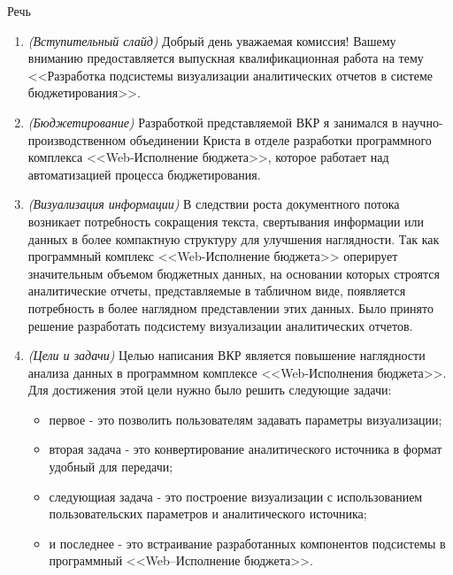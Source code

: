 \documentclass[a4paper]{report}
\begin{document}
\begin{center}
    \Large Речь
\end{center}

\begin{enumerate}[label=\textbf{\arabic*})]
    \item \textit{(Вступительный слайд)} Добрый день уважаемая комиссия! Вашему вниманию пре\-доставляется выпускная квалификационная работа на тему <<Разработка подсистемы визуализации аналитических отчетов в системе бюджетирования>>.
    \item \textit{(Бюджетирование)} Разработкой представляемой ВКР я занимался в научно-произ\-водственном объединении Криста в отделе разработки программного комплекса \-<<Web-Исполнение бюджета>>, которое работает над автоматизацией процесса бюджетирования. %
    \item \textit{(Визуализация информации)} В следствии роста документного потока возникает потребность сокращения текста, свертывания информации или данных в более компактную структуру для улучшения наглядности. Так как программный комплекс <<Web-Исполнение бюджета>> оперирует значительным объемом бюджетных данных, на основании которых строятся аналитические отчеты, представляемые в табличном виде, появляется потребность в более наглядном представлении этих данных. Было принято решение разработать подсистему визуализации аналитических отчетов.
    \item \textit{(Цели и задачи)} Целью написания ВКР является повышение наглядности анализа данных в программном комплексе <<Web-Исполнения бюджета>>. Для достижения этой цели нужно было решить следующие задачи:
        \begin{itemize}
            \item первое - это позволить пользователям задавать параметры визуализации;
            \item вторая задача - это конвертирование аналитического источника в формат удобный для передачи;
            \item следующиая задача - это построение визуализации с использованием пользовательских параметров и \-аналитического источника;
            \item и последнее - это встраивание разработанных компонентов подсистемы в программный <<Web–Исполнение бюджета>>.
        \end{itemize}

\end{enumerate}
\end{document}
